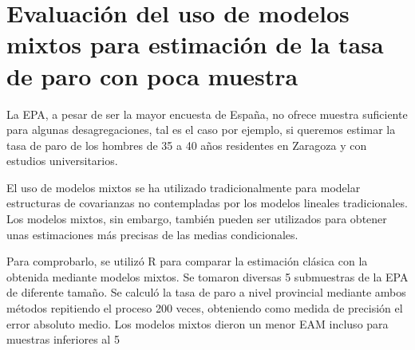 \chapter{Evaluación del uso de modelos mixtos para estimación de la tasa de paro con poca muestra}




La EPA, a pesar de ser la mayor encuesta de España, no ofrece muestra suficiente para algunas desagregaciones, tal es el caso por ejemplo, si queremos estimar la tasa de paro de los hombres de 35 a 40 años residentes en Zaragoza y con estudios universitarios.

El uso de modelos mixtos se ha utilizado tradicionalmente para modelar estructuras de covarianzas no contempladas por los modelos lineales tradicionales. Los modelos mixtos, sin embargo, también pueden ser utilizados para obtener unas estimaciones más precisas de las medias condicionales.

Para comprobarlo, se utilizó R para comparar la estimación clásica con la obtenida mediante modelos mixtos. Se tomaron diversas 5 submuestras de la EPA de diferente tamaño. Se calculó la tasa de paro a nivel provincial mediante ambos métodos repitiendo el proceso 200 veces, obteniendo como medida de precisión el error absoluto medio. Los modelos mixtos dieron un menor EAM incluso para muestras inferiores al 5%


%

%
